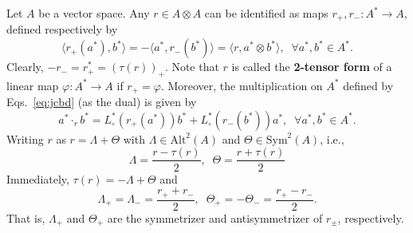 \documentclass[12pt, reqno, a4paper]{amsart}
\theoremstyle{definition}
\begin{document}
Let $A$ be a vector space.
Any $r \in A \otimes A$ can be identified as maps $r_{+}, r_{-}: A^* \to A$, defined respectively by
\begin{equation*}
	\langle r_{+}(a^*), b^*\rangle = -\langle a^*, r_{-}(b^*)\rangle = \langle r, a^* \otimes b^*\rangle, \;\; \forall a^*, b^* \in A^*.
\end{equation*}
Clearly, $-r_{-} = r_{+}^* = (\tau(r))_{+}$.
Note that $r$ is called the \textbf{2-tensor form} of a linear map $\varphi: A^* \to A$ if $r_{+} = \varphi$.
Moreover, the multiplication on $A^*$ defined by Eqs.~\eqref{eq:jcbd} (as the dual) is given by
\begin{equation}
	a^* \cdot_r b^* = L_{\circ}^*(r_{+}(a^*)) b^* + L_{\circ}^*(r_{-}(b^*)) a^*, \;\; \forall a^*, b^* \in A^*. \label{eq:pcbdr}
\end{equation}
Writing $r$ as $r = \Lambda + \Theta$ with $\Lambda \in \mathrm{Alt}^2(A)$ and $\Theta \in \mathrm{Sym}^2(A)$, i.e.,
\begin{equation*}
	\Lambda = \frac{r - \tau(r)}{2}, \;\; \Theta = \frac{r + \tau(r)}{2}
\end{equation*}
Immediately, $\tau(r) = -\Lambda + \Theta$ and 
\begin{equation*}
	\Lambda_{+} = \Lambda_{-} = \frac{r_{+} + r_{-}}{2}, \;\; \Theta_{+} = -\Theta_{-} = \frac{r_{+} - r_{-}}{2}.
\end{equation*}
That is, $\Lambda_{+}$ and $\Theta_{+}$ are the symmetrizer and antisymmetrizer of $r_{\pm}$, respectively.
\end{document}
